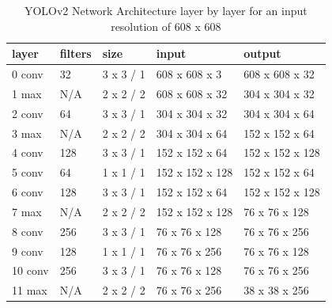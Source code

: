 \begin{center}
\begin{table}[h]\footnotesize
    \caption{YOLOv2 Network Architecture layer by layer for an input resolution of 608 x 608}\label{table:YOLOV2}
    \begin{tabular}{| l | l | l | l | l |}
    \hline
    layer  & filters & size & input & output \\ \hline \hline

    \rowcolor{LightCyan}
    0 conv & 32 & 3 x 3 / 1 & 608 x 608 x 3 & 608 x 608 x 32 \\ \hline

    \rowcolor{Salmon}
    1 max  & N/A & 2 x 2 / 2 & 608 x 608 x  32   &  304 x 304 x  32 \\ \hline \hline

    \rowcolor{LightCyan}
    2 conv &       64  & 3 x 3 / 1   & 304 x 304 x  32   & 304 x 304 x  64 \\ \hline

    \rowcolor{Salmon}
    3 max &     N/A     & 2 x 2 / 2   & 304 x 304 x  64   &   152 x 152 x  64 \\ \hline \hline

    \rowcolor{LightCyan}
    4 conv &    128  & 3 x 3 / 1   & 152 x 152 x  64   &   152 x 152 x 128 \\ \hline

    \rowcolor{LightCyan}
    5 conv &     64  & 1 x 1 / 1   & 152 x 152 x 128   &   152 x 152 x  64 \\ \hline

    \rowcolor{LightCyan}
    6 conv &    128  & 3 x 3 / 1   & 152 x 152 x  64   &   152 x 152 x 128 \\ \hline

    \rowcolor{Salmon}
    7 max &     N/A     & 2 x 2 / 2   & 152 x 152 x 128   &    76 x  76 x 128 \\ \hline \hline

    \rowcolor{LightCyan}
    8 conv &    256  & 3 x 3 / 1   &  76 x  76 x 128   &    76 x  76 x 256 \\ \hline

    \rowcolor{LightCyan}
    9 conv &    128  & 1 x 1 / 1   &  76 x  76 x 256   &    76 x  76 x 128 \\ \hline

    \rowcolor{LightCyan}
   10 conv &    256  & 3 x 3 / 1   &  76 x  76 x 128   &    76 x  76 x 256 \\ \hline

    \rowcolor{Salmon}
   11 max &     N/A     & 2 x 2 / 2   &  76 x  76 x 256   &    38 x  38 x 256 \\ \hline \hline


\end{tabular}
\end{table}
\end{center}
